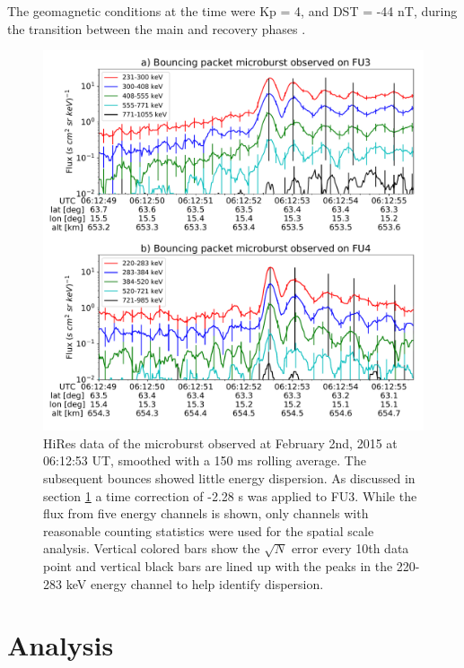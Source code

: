 \documentclass[draft, linenumbers]{agujournal}
\begin{document}
The geomagnetic conditions at the time were Kp = 4,  and DST = -44 nT, during the transition between the main and recovery phases . 

\begin{figure}
\includegraphics[width=\textwidth]{hires_plot_log_8pt_smooth_pos_v2.pdf}
\caption{HiRes data of the microburst observed at February 2nd, 2015 at 06:12:53 UT, smoothed with a 150 ms rolling average. The subsequent bounces showed little energy dispersion. As discussed in section \ref{analysis} a time correction of -2.28 s was applied to FU3. While the flux from five energy channels is shown, only channels with reasonable counting statistics were used for the spatial scale analysis. Vertical colored bars show the $\sqrt{N}$ error every 10th data point and vertical black bars are lined up with the peaks in the 220-283 keV energy channel to help identify dispersion.}
\label{hires_plot}
\end{figure}

\section{Analysis} \label{analysis} %
\end{document}
